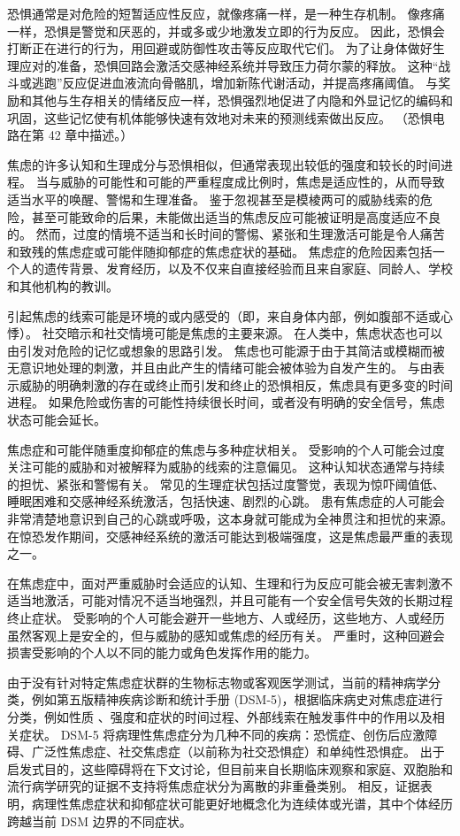 恐惧通常是对危险的短暂适应性反应，就像疼痛一样，是一种生存机制。 像疼痛一样，恐惧是警觉和厌恶的，并或多或少地激发立即的行为反应。 因此，恐惧会打断正在进行的行为，用回避或防御性攻击等反应取代它们。 为了让身体做好生理应对的准备，恐惧回路会激活交感神经系统并导致压力荷尔蒙的释放。 这种“战斗或逃跑”反应促进血液流向骨骼肌，增加新陈代谢活动，并提高疼痛阈值。 与奖励和其他与生存相关的情绪反应一样，恐惧强烈地促进了内隐和外显记忆的编码和巩固，这些记忆使有机体能够快速有效地对未来的预测线索做出反应。 （恐惧电路在第 42 章中描述。）

焦虑的许多认知和生理成分与恐惧相似，但通常表现出较低的强度和较长的时间进程。 当与威胁的可能性和可能的严重程度成比例时，焦虑是适应性的，从而导致适当水平的唤醒、警惕和生理准备。 鉴于忽视甚至是模棱两可的威胁线索的危险，甚至可能致命的后果，未能做出适当的焦虑反应可能被证明是高度适应不良的。 然而，过度的情境不适当和长时间的警惕、紧张和生理激活可能是令人痛苦和致残的焦虑症或可能伴随抑郁症的焦虑症状的基础。 焦虑症的危险因素包括一个人的遗传背景、发育经历，以及不仅来自直接经验而且来自家庭、同龄人、学校和其他机构的教训。

引起焦虑的线索可能是环境的或内感受的（即，来自身体内部，例如腹部不适或心悸）。 社交暗示和社交情境可能是焦虑的主要来源。 在人类中，焦虑状态也可以由引发对危险的记忆或想象的思路引发。 焦虑也可能源于由于其简洁或模糊而被无意识地处理的刺激，并且由此产生的情绪可能会被体验为自发产生的。 与由表示威胁的明确刺激的存在或终止而引发和终止的恐惧相反，焦虑具有更多变的时间进程。 如果危险或伤害的可能性持续很长时间，或者没有明确的安全信号，焦虑状态可能会延长。

焦虑症和可能伴随重度抑郁症的焦虑与多种症状相关。 受影响的个人可能会过度关注可能的威胁和对被解释为威胁的线索的注意偏见。 这种认知状态通常与持续的担忧、紧张和警惕有关。 常见的生理症状包括过度警觉，表现为惊吓阈值低、睡眠困难和交感神经系统激活，包括快速、剧烈的心跳。 患有焦虑症的人可能会非常清楚地意识到自己的心跳或呼吸，这本身就可能成为全神贯注和担忧的来源。 在惊恐发作期间，交感神经系统的激活可能达到极端强度，这是焦虑最严重的表现之一。

在焦虑症中，面对严重威胁时会适应的认知、生理和行为反应可能会被无害刺激不适当地激活，可能对情况不适当地强烈，并且可能有一个安全信号失效的长期过程 终止症状。 受影响的个人可能会避开一些地方、人或经历，这些地方、人或经历虽然客观上是安全的，但与威胁的感知或焦虑的经历有关。 严重时，这种回避会损害受影响的个人以不同的能力或角色发挥作用的能力。

由于没有针对特定焦虑症状群的生物标志物或客观医学测试，当前的精神病学分类，例如第五版精神疾病诊断和统计手册 (DSM-5)，根据临床病史对焦虑症进行分类，例如性质 、强度和症状的时间过程、外部线索在触发事件中的作用以及相关症状。 DSM-5 将病理性焦虑症分为几种不同的疾病：恐慌症、创伤后应激障碍、广泛性焦虑症、社交焦虑症（以前称为社交恐惧症）和单纯性恐惧症。 出于启发式目的，这些障碍将在下文讨论，但目前来自长期临床观察和家庭、双胞胎和流行病学研究的证据不支持将焦虑症状分为离散的非重叠类别。 相反，证据表明，病理性焦虑症状和抑郁症状可能更好地概念化为连续体或光谱，其中个体经历跨越当前 DSM 边界的不同症状。

